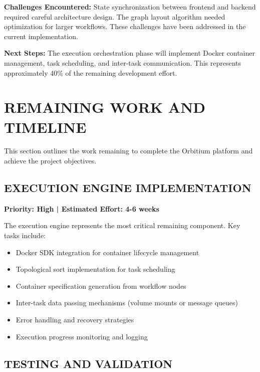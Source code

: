 \documentclass[12pt]{article}
\begin{document}
\hspace{\parindent}\textbf{Challenges Encountered:} State synchronization between frontend and backend required careful architecture design. The graph layout algorithm needed optimization for larger workflows. These challenges have been addressed in the current implementation.

\hspace{\parindent}\textbf{Next Steps:} The execution orchestration phase will implement Docker container management, task scheduling, and inter-task communication. This represents approximately 40\% of the remaining development effort.

\newpage
\section{REMAINING WORK AND TIMELINE}

\hspace{\parindent}This section outlines the work remaining to complete the Orbitium platform and achieve the project objectives.

\subsection{EXECUTION ENGINE IMPLEMENTATION}

\hspace{\parindent}\textbf{Priority: High | Estimated Effort: 4-6 weeks}

The execution engine represents the most critical remaining component. Key tasks include:

\begin{itemize}
    \item Docker SDK integration for container lifecycle management
    \item Topological sort implementation for task scheduling
    \item Container specification generation from workflow nodes
    \item Inter-task data passing mechanisms (volume mounts or message queues)
    \item Error handling and recovery strategies
    \item Execution progress monitoring and logging
\end{itemize}

\subsection{TESTING AND VALIDATION}
\end{document}
